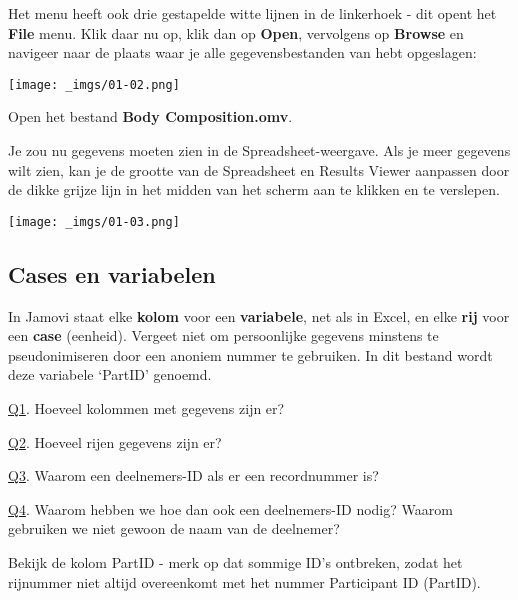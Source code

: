 \documentclass[
  letterpaper,
  DIV=11,
  numbers=noendperiod]{scrartcl}
\begin{document}
Het menu heeft ook drie gestapelde witte lijnen in de linkerhoek - dit
opent het \textbf{File} menu. Klik daar nu op, klik dan op
\textbf{Open}, vervolgens op \textbf{Browse} en navigeer naar de plaats
waar je alle gegevensbestanden van hebt opgeslagen:

\texttt{[image: \_imgs/01-02.png]}

Open het bestand \textbf{Body Composition.omv}.

Je zou nu gegevens moeten zien in de Spreadsheet-weergave. Als je meer
gegevens wilt zien, kan je de grootte van de Spreadsheet en Results
Viewer aanpassen door de dikke grijze lijn in het midden van het scherm
aan te klikken en te verslepen.

\texttt{[image: \_imgs/01-03.png]}

\hypertarget{cases-en-variabelen}{%
\subsection{Cases en variabelen}\label{cases-en-variabelen}}

In Jamovi staat elke \textbf{kolom} voor een \textbf{variabele}, net als
in Excel, en elke \textbf{rij} voor een \textbf{case} (eenheid). Vergeet
niet om persoonlijke gegevens minstens te pseudonimiseren door een
anoniem nummer te gebruiken. In dit bestand wordt deze variabele
`PartID' genoemd.

\begin{tcolorbox}[beforeafter skip=1cm, ignore nobreak=true, breakable, colframe=Questions-frame, colback=Questions-bg, coltext=Questions-text, boxsep=2mm, arc=0mm, boxrule=0.5mm]

\protect\hypertarget{Q1}{\protect\hyperlink{A1}{Q1}}. Hoeveel kolommen
met gegevens zijn er?

\protect\hypertarget{Q2}{\protect\hyperlink{A2}{Q2}}. Hoeveel rijen
gegevens zijn er?

\protect\hypertarget{Q3}{\protect\hyperlink{A3}{Q3}}. Waarom een
deelnemers-ID als er een recordnummer is?

\protect\hypertarget{Q4}{\protect\hyperlink{A4}{Q4}}. Waarom hebben we
hoe dan ook een deelnemers-ID nodig? Waarom gebruiken we niet gewoon de
naam van de deelnemer?

\end{tcolorbox}

Bekijk de kolom PartID - merk op dat sommige ID's ontbreken, zodat het
rijnummer niet altijd overeenkomt met het nummer Participant ID
(PartID).
\end{document}
